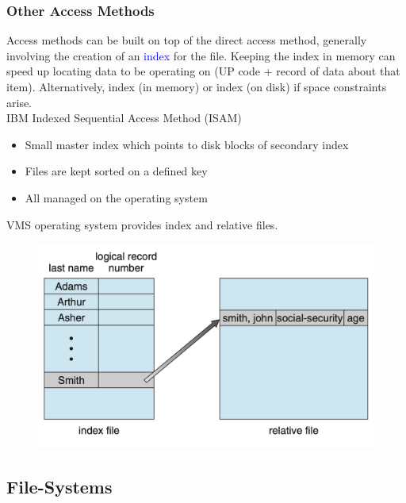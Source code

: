 \documentclass[oneside]{book}
\begin{document}
                \subsubsection{Other Access Methods}
                    Access methods can be built on top of the direct access method, generally involving the creation of 
                    an \textcolor{blue}{index} for the file. Keeping the index in memory can speed up locating data to be operating
                    on (UP code + record of data about that item). Alternatively, index (in memory) or index (on disk) if
                    space constraints arise.\\
                    IBM Indexed Sequential Access Method (ISAM)\\
                    \begin{itemize}
                        \item Small master index which points to disk blocks of secondary index
                        \item Files are kept sorted on a defined key
                        \item All managed on the operating system
                    \end{itemize}
                    VMS operating system provides index and relative files.
                    \begin{figure}
                        \centering
                        \includegraphics[width=0.6\linewidth]{figures/index_and_relative_files.png}
                    \end{figure}
            \subsection{File-Systems}
\end{document}
